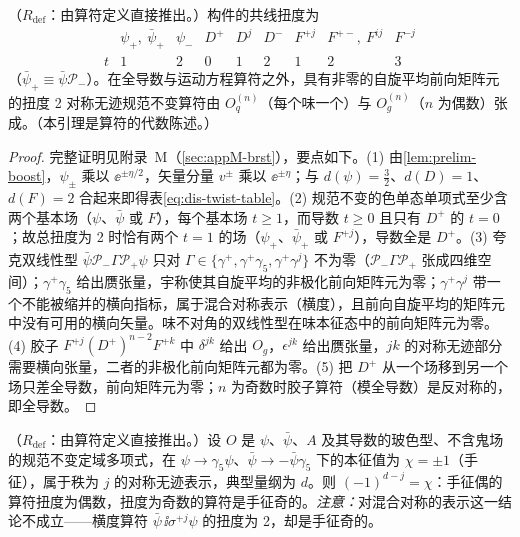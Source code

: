 \begin{lemma}\label{lem:dis-twist-classification}
（$R_{\mathrm{def}}$：由算符定义直接推出。）构件的共线扭度为
\begin{equation}\label{eq:dis-twist-table}
\begin{array}{c|cccccccc}
 & \psi_+,\ \bar\psi_+ & \psi_- & D^+ & D^j & D^- & F^{+j} & F^{+-},\ F^{ij} & F^{-j}\\\hline
t & 1 & 2 & 0 & 1 & 2 & 1 & 2 & 3
\end{array}
\end{equation}
（$\bar\psi_+\equiv\bar\psi\mathcal P_-$）。在全导数与运动方程算符之外，具有非零的自旋平均前向矩阵元的扭度 2 对称无迹规范不变算符由 $O^{(n)}_q$（每个味一个）与 $O^{(n)}_g$（$n$ 为偶数）张成。（本引理是算符的代数陈述。）
\end{lemma}

\begin{proof}
完整证明见附录~M（\cref{sec:appM-brst}），要点如下。(1) 由\cref{lem:prelim-boost}，$\psi_\pm$ 乘以 $\ee^{\pm\eta/2}$，矢量分量 $v^\pm$ 乘以 $\ee^{\pm\eta}$；与 $d(\psi)=\frac32$、$d(D)=1$、$d(F)=2$ 合起来即得表\cref{eq:dis-twist-table}。(2) 规范不变的色单态单项式至少含两个基本场（$\psi$、$\bar\psi$ 或 $F$），每个基本场 $t\ge1$，而导数 $t\ge0$ 且只有 $D^+$ 的 $t=0$；故总扭度为 2 时恰有两个 $t=1$ 的场（$\psi_+$、$\bar\psi_+$ 或 $F^{+j}$），导数全是 $D^+$。(3) 夸克双线性型 $\bar\psi\mathcal P_-\Gamma\mathcal P_+\psi$ 只对 $\Gamma\in\{\gamma^+,\gamma^+\gamma_5,\gamma^+\gamma^j\}$ 不为零（$\mathcal P_-\Gamma\mathcal P_+$ 张成四维空间）；$\gamma^+\gamma_5$ 给出赝张量，宇称使其自旋平均的非极化前向矩阵元为零；$\gamma^+\gamma^j$ 带一个不能被缩并的横向指标，属于混合对称表示（横度），且前向自旋平均的矩阵元中没有可用的横向矢量。味不对角的双线性型在味本征态中的前向矩阵元为零。(4) 胶子 $F^{+j}(D^+)^{n-2}F^{+k}$ 中 $\delta^{jk}$ 给出 $O_g$，$\epsilon^{jk}$ 给出赝张量，$jk$ 的对称无迹部分需要横向张量，二者的非极化前向矩阵元都为零。(5) 把 $D^+$ 从一个场移到另一个场只差全导数，前向矩阵元为零；$n$ 为奇数时胶子算符（模全导数）是反对称的，即全导数。
\end{proof}

\begin{lemma}\label{lem:dis-twist-chirality}
（$R_{\mathrm{def}}$：由算符定义直接推出。）设 $O$ 是 $\psi$、$\bar\psi$、$A$ 及其导数的玻色型、不含鬼场的规范不变定域多项式，在 $\psi\to\gamma_5\psi$、$\bar\psi\to-\bar\psi\gamma_5$ 下的本征值为 $\chi=\pm1$（手征），属于秩为 $j$ 的对称无迹表示，典型量纲为 $d$。则 $(-1)^{d-j}=\chi$：手征偶的算符扭度为偶数，扭度为奇数的算符是手征奇的。\emph{注意：}对混合对称的表示这一结论不成立——横度算符 $\bar\psi\,\ii\sigma^{+j}\psi$ 的扭度为 2，却是手征奇的。
\end{lemma}


